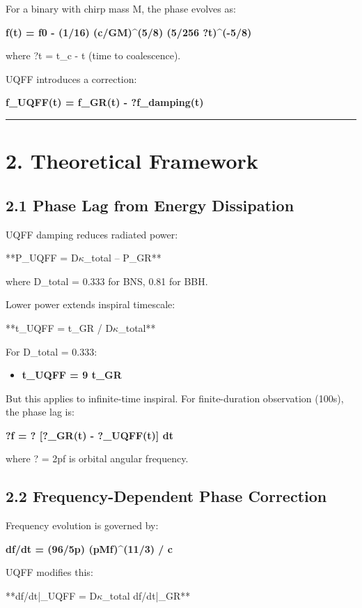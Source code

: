 \documentclass[11pt]{article}
\begin{document}
For a binary with chirp mass M, the phase evolves as:

\textbf{f(t) = f0 - (1/16) (c/GM)\textasciicircum{}(5/8) (5/256 ?t)\textasciicircum{}(-5/8)}

where ?t = t\_c - t (time to coalescence).

UQFF introduces a correction:

\textbf{f\_UQFF(t) = f\_GR(t) - ?f\_damping(t)}

\noindent\rule{\textwidth}{0.4pt}

\section*{2. Theoretical Framework}

\subsection*{2.1 Phase Lag from Energy Dissipation}

UQFF damping reduces radiated power:

**P\_UQFF = D$\kappa$\_total -- P\_GR**

where D\_total = 0.333 for BNS, 0.81 for BBH.

Lower power extends inspiral timescale:

**t\_UQFF = t\_GR / D$\kappa$\_total**

For D\_total = 0.333:

\begin{itemize}
  \item \textbf{t\_UQFF = 9 t\_GR}
\end{itemize}

But this applies to infinite-time inspiral. For finite-duration observation (100s), the phase lag is:

\textbf{?f = ? [?\_GR(t) - ?\_UQFF(t)] dt}

where ? = 2pf is orbital angular frequency.

\subsection*{2.2 Frequency-Dependent Phase Correction}

Frequency evolution is governed by:

\textbf{df/dt = (96/5p) (pMf)\textasciicircum{}(11/3) / c}

UQFF modifies this:

**df/dt|\_UQFF = D$\kappa$\_total  df/dt|\_GR**
\end{document}
